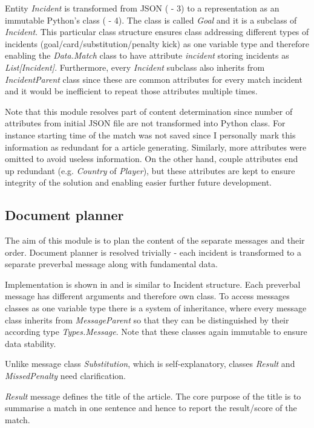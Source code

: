 Entity \emph{Incident} is transformed from JSON ( - 3) to a representation as an immutable Python's class ( - 4). The class is called \emph{Goal} and it is a subclass of \emph{Incident}. This particular class structure ensures class addressing different types of incidents (goal/card/substitution/penalty kick) as one variable type and therefore enabling the \textit{Data.Match} class to have attribute \textit{incident} storing incidents as \emph{List[Incident]}. Furthermore, every \textit{Incident} subclass also inherits from \emph{IncidentParent} class since these are common attributes for every match incident and it would be inefficient to repeat those attributes multiple times.

Note that this module resolves part of content determination since number of attributes from initial JSON file are not transformed into Python class. For instance starting time of the match was not saved since I personally mark this information as redundant for a article generating. Similarly, more attributes were omitted to avoid useless information. On the other hand, couple attributes end up redundant (e.g. \textit{Country} of \textit{Player}), but these attributes are kept to ensure integrity of the solution and enabling easier further future development. 

\subsection{Document planner}

The aim of this module is to plan the content of the separate messages and their order. Document planner is resolved trivially - each incident is transformed to a separate preverbal message along with fundamental data. 

Implementation is shown in  and is similar to Incident structure. Each preverbal message has different arguments and therefore own class. To access messages classes as one variable type there is a system of inheritance, where every message class inherits from \textit{MessageParent} so that they can be distinguished by their according type \textit{Types.Message}. Note that these classes again immutable to ensure data stability.

Unlike message class \textit{Substitution}, which is self-explanatory, classes \textit{Result} and \textit{MissedPenalty} need clarification. 

\textit{Result} message defines the title of the article. The core purpose of the title is to summarise a match in one sentence and hence to report the result/score of the match. 


